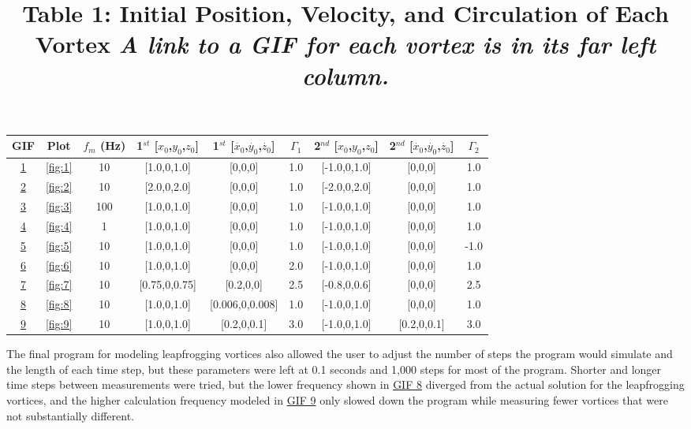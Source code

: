 \documentclass{article}
\begin{document}
{\begin{table}
	\centering
	\title{Table 1: Initial Position, Velocity, and Circulation of Each Vortex \newline}
	\title{\emph{A link to a GIF for each vortex is in its far left column.}}
	\begin{tabular}{ | c | c | c | c | c | c | c | c | c |}
		\hline
		GIF & Plot & $f_m$ (Hz) & 1$^{st}$ [$x_0$,$y_0$,$z_0$] & 1$^{st}$ [$\dot{x_0}$,$\dot{y_0}$,$\dot{z_0}$] & $\Gamma_1$ & 2$^{nd}$ [$x_0$,$y_0$,$z_0$] & 2$^{nd}$ [$\dot{x_0}$,$\dot{y_0}$,$\dot{z_0}$] & $\Gamma_2$ \\ \hline
		\href{https://imgur.com/U4cND6X}{1} & \ref{fig:1} & 10 & [1.0,0,1.0] & [0,0,0] & 1.0 & [-1.0,0,1.0] & [0,0,0] & 1.0 \\ \hline
		\href{https://imgur.com/lviamWB}{2} & \ref{fig:2} & 10 & [2.0,0,2.0] & [0,0,0] & 1.0 & [-2.0,0,2.0] & [0,0,0] & 1.0 \\ \hline
		\href{https://imgur.com/6jT1mT0}{3} & \ref{fig:3} & 100 & [1.0,0,1.0] & [0,0,0] & 1.0 & [-1.0,0,1.0] & [0,0,0] & 1.0 \\ \hline
		\href{https://imgur.com/PtazOFB}{4} & \ref{fig:4} & 1 & [1.0,0,1.0] & [0,0,0] & 1.0 & [-1.0,0,1.0] & [0,0,0] & 1.0 \\ \hline	
		\href{https://imgur.com/wSpWEQV}{5} & \ref{fig:5} & 10 & [1.0,0,1.0] & [0,0,0] & 1.0 & [-1.0,0,1.0] & [0,0,0] & -1.0 \\ \hline
		\href{https://imgur.com/aZzMnJV}{6} & \ref{fig:6} & 10 & [1.0,0,1.0] & [0,0,0] & 2.0 & [-1.0,0,1.0] & [0,0,0] & 1.0 \\ \hline
		\href{https://imgur.com/nKVGuJ9}{7} & \ref{fig:7} & 10 & [0.75,0,0.75] & [0.2,0,0] & 2.5 & [-0.8,0,0.6] & [0,0,0] & 2.5 \\ \hline
		\href{https://imgur.com/UZyBsYO}{8} & \ref{fig:8} & 10 & [1.0,0,1.0] & [0.006,0,0.008] & 1.0 & [-1.0,0,1.0] & [0,0,0] & 1.0 \\ \hline
		\href{https://imgur.com/tctJPyS}{9} & \ref{fig:9} & 10 & [1.0,0,1.0] & [0.2,0,0.1] & 3.0 & [-1.0,0,1.0] & [0.2,0,0.1] & 3.0 \\ \hline
	\end{tabular}
\end{table}

The final program for modeling leapfrogging vortices also allowed the user to adjust the number of steps the program would simulate and the length of each time step, but these parameters were left at 0.1 seconds and 1,000 steps for most of the program. Shorter and longer time steps between measurements were tried, but the lower frequency shown in \href{https://imgur.com/PtazOFB}{GIF 8} diverged from the actual solution for the leapfrogging vortices, and the higher calculation frequency modeled in \href{https://imgur.com/6jT1mT0}{GIF 9} only slowed down the program while measuring fewer vortices that were not substantially different. \newline

}
\end{document}
